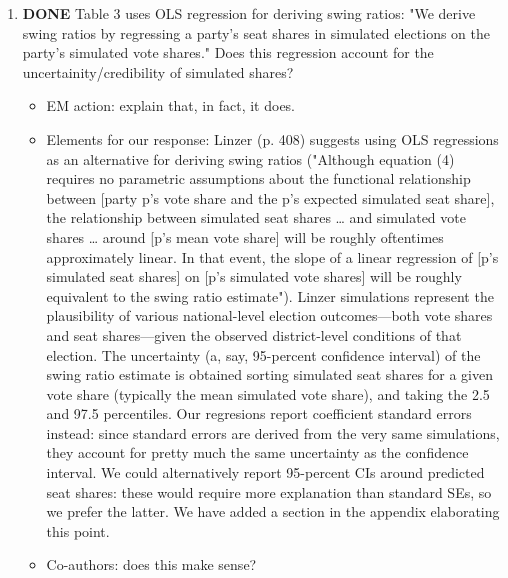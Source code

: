 \documentclass{article}
\begin{document}
\begin{enumerate}
\begin{itemize}
\end{itemize}
\item {\bfseries\sffamily DONE} Table 3 uses OLS regression for deriving swing ratios: "We derive swing ratios by regressing a party's seat shares in simulated elections on the party's simulated vote shares." Does this regression account for the uncertainity/credibility of simulated shares?
\label{sec:orgheadline30}
\begin{itemize}
\item EM action: explain that, in fact, it does.
\item Elements for our response: Linzer (p. 408) suggests using OLS regressions as an alternative for deriving swing ratios ("Although equation (4) requires no parametric assumptions about the functional relationship between [party p's vote share and the p's expected simulated seat share], the relationship between simulated seat shares \ldots{} and simulated vote shares \ldots{} around [p's mean vote share] will be roughly oftentimes approximately linear. In that event, the slope of a linear regression of [p's simulated seat shares] on [p's simulated vote shares] will be roughly equivalent to the swing ratio estimate"). Linzer simulations represent the plausibility of various national-level election outcomes---both vote shares and seat shares---given the observed district-level conditions of that election. The uncertainty (a, say, 95-percent confidence interval) of the swing ratio estimate is obtained sorting simulated seat shares for a given vote share (typically the mean simulated vote share), and taking the 2.5 and 97.5 percentiles. Our regresions report coefficient standard errors instead: since standard errors are derived from the very same simulations, they account for pretty much the same uncertainty as the confidence interval. We could alternatively report 95-percent CIs around predicted seat shares: these would require more explanation than standard SEs, so we prefer the latter. We have added a section in the appendix elaborating this point.
\item Co-authors: does this make sense?
\end{itemize}
\end{enumerate}
\end{document}
